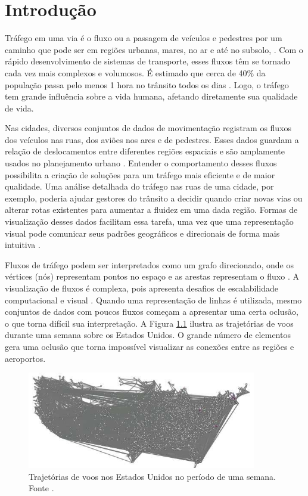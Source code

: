 \chapter{Introdução}
\label{cap:introducao}

  Tráfego em uma via é o fluxo ou a passagem de veículos e pedestres por
um caminho que pode ser em regiões urbanas, mares,
no ar e até no subsolo, \citep{Chen2015}. Com o rápido desenvolvimento de
sistemas de transporte, esses fluxos têm se tornado cada vez mais complexos e
volumosos.  É estimado que cerca de 40\% da população passa pelo menos 1 hora
no trânsito todos os dias \citep{Zhang2011}. Logo, o tráfego tem grande
influência sobre a vida humana, afetando diretamente sua qualidade de vida.

Nas cidades, diversos conjuntos de dados de movimentação registram os fluxos
dos veículos nas ruas, dos aviões nos ares e de pedestres. Esses dados guardam
a relação de deslocamentos entre diferentes regiões espaciais e são amplamente
usados no planejamento urbano \citep{Anita2017}.  Entender o comportamento
desses fluxos possibilita a criação de soluções para um tráfego mais eficiente
e de maior qualidade. Uma análise detalhada do tráfego nas ruas de uma cidade,
por exemplo, poderia ajudar gestores do trânsito a decidir quando criar novas vias
ou alterar rotas existentes para aumentar a fluidez em uma dada região. Formas
de visualização desses dados facilitam essa tarefa, uma vez que uma representação
visual pode comunicar seus padrões geográficos e direcionais de forma mais intuitiva
\citep{Liu2013}.

  Fluxos de tráfego podem ser interpretados como um grafo direcionado, onde os
vértices (nós) representam pontos no espaço e as arestas representam o fluxo
\citep{Anita2017}. A visualização de fluxos é complexa, pois
apresenta desafios de escalabilidade computacional e visual \citep{Klein2014}. Quando
uma representação de linhas é utilizada, mesmo conjuntos de dados com poucos fluxos
começam a apresentar uma certa oclusão, o que torna difícil sua interpretação.
A Figura \ref{fig:exemplo-oclusao} ilustra as trajetórias de voos durante uma semana
sobre os Estados Unidos. O grande número de elementos gera uma oclusão que torna
impossível visualizar as conexões entre as regiões e aeroportos.

\begin{figure}[!htb]
  \centering
  \includegraphics[width=100mm]{../figuras/cluttered-map.png}
  \caption[Trajetórias de voos nos Estados Unidos]{Trajetórias de voos nos Estados Unidos no período de uma semana. Fonte \citet{Zhou2013}.}
  \label{fig:exemplo-oclusao}
\end{figure}

